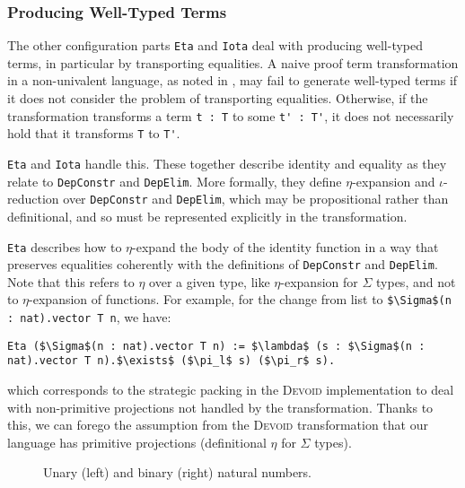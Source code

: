 \subsubsection{Producing Well-Typed Terms}
\label{sec:equality}

The other configuration parts \lstinline{Eta} and \lstinline{Iota} deal with producing well-typed terms,
in particular by transporting equalities.
A naive proof term transformation in a non-univalent language, as noted in \citet{tabareau2019marriage},
may fail to generate well-typed terms if it does not consider the problem of transporting equalities.
Otherwise, if the transformation transforms a term \lstinline{t : T} to some \lstinline{t' : T'}, it does not necessarily
hold that it transforms \lstinline{T} to \lstinline{T'}.

\lstinline{Eta} and \lstinline{Iota} handle this.
These together describe identity and equality as they relate to \lstinline{DepConstr} and \lstinline{DepElim}.
More formally, they define $\eta$-expansion and $\iota$-reduction over \lstinline{DepConstr} and \lstinline{DepElim},
which may be propositional rather than definitional, and so must be represented explicitly in the transformation.

\lstinline{Eta} describes how to $\eta$-expand the body of the identity function in a way that preserves equalities
coherently with the definitions of \lstinline{DepConstr} and \lstinline{DepElim}.
Note that this refers to $\eta$ over a given type, like $\eta$-expansion for $\Sigma$ types, and not to $\eta$-expansion of functions.
For example, for the change from list to \lstinline{$\Sigma$(n : nat).vector T n}, we have:

\begin{lstlisting}
Eta ($\Sigma$(n : nat).vector T n) := $\lambda$ (s : $\Sigma$(n : nat).vector T n).$\exists$ ($\pi_l$ s) ($\pi_r$ s).
\end{lstlisting}
which corresponds to the strategic packing in the \textsc{Devoid} implementation to deal with
non-primitive projections not handled by the transformation. Thanks to this, we can forego the assumption from the \textsc{Devoid} transformation
that our language has primitive projections (definitional $\eta$ for $\Sigma$ types).

\begin{figure}
\begin{minipage}{0.48\textwidth}
   
\end{minipage}
\hfill
\begin{minipage}{0.48\textwidth}
   
\end{minipage}
\vspace{-0.2cm}
\caption{Unary (left) and binary (right) natural numbers.}
\label{fig:nattobin}
\end{figure}

